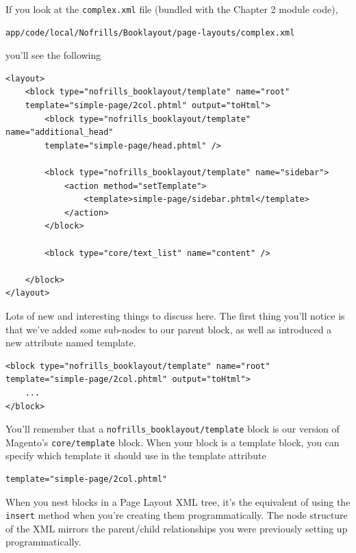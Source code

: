 \documentclass[oneside]{book}
\begin{document}
If you look at the \footnotesize\texttt{complex.xml} \normalsize  file (bundled with the Chapter 2 module code),

\begin{lstlisting}
app/code/local/Nofrills/Booklayout/page-layouts/complex.xml

\end{lstlisting}


you'll see the following

\begin{lstlisting}
<layout>
    <block type="nofrills_booklayout/template" name="root"
    template="simple-page/2col.phtml" output="toHtml">
        <block type="nofrills_booklayout/template" name="additional_head"
        template="simple-page/head.phtml" />

        <block type="nofrills_booklayout/template" name="sidebar">
            <action method="setTemplate">
                <template>simple-page/sidebar.phtml</template>
            </action>
        </block>

        <block type="core/text_list" name="content" />

    </block>
</layout>

\end{lstlisting}


Lots of new and interesting things to discuss here.  The first thing you'll notice is that we've added some sub-nodes to our parent block, as well as introduced a new attribute named template.

\begin{lstlisting}
<block type="nofrills_booklayout/template" name="root"
template="simple-page/2col.phtml" output="toHtml">
    ...
</block>

\end{lstlisting}


You'll remember that a \footnotesize\texttt{nofrills\_booklayout/template} \normalsize  block is our version of Magento's \footnotesize\texttt{core/template} \normalsize  block.  When your block is a template block, you can specify which template it should use in the template attribute

\begin{lstlisting}
template="simple-page/2col.phtml"

\end{lstlisting}


When you nest blocks in a Page Layout XML tree, it's the equivalent of using the \footnotesize\texttt{insert} \normalsize  method when you're creating them programmatically.  The node structure of the XML mirrors the parent/child relationships you were previously setting up programmatically.
\end{document}
